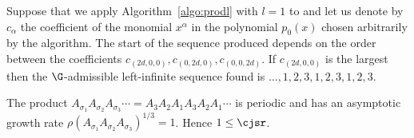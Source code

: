 \begin{myexem}
  \label{exem:simple3}
  Suppose that we apply Algorithm~\ref{algo:prodl} with $l = 1$ to 
  and let us denote by $c_\alpha$ the coefficient of the monomial $x^\alpha$ in the polynomial $p_0(x)$ chosen arbitrarily by the algorithm.
  The start of the sequence produced depends on the order between
  the coefficients $c_{(2d,0,0)},\allowbreak c_{(0,2d,0)},\allowbreak c_{(0,0,2d)}$.
  If $c_{(2d,0,0)}$ is the largest then
  the $\G$-admissible left-infinite sequence found is
  \( \ldots,1,2,3,1,2,3,1,2,3. \)

  The product $A_{\sigma_1} A_{\sigma_2} A_{\sigma_3} \cdots = A_3A_2A_1A_3A_2A_1 \cdots $
  is periodic and has an asymptotic growth rate $\rho(A_{\sigma_1}A_{\sigma_2}A_{\sigma_3})^{1/3}\allowbreak = 1$.
  Hence $1 \leq \cjsr$.
\end{myexem}
